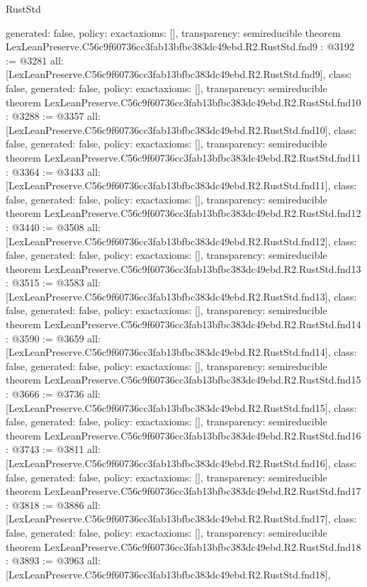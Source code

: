 \begin{lexlean}{RustStd}
\begin{coremodule}
{  generated: false,
  policy: exact{axioms: []},
  transparency: semireducible
}
theorem LexLeanPreserve.C56c9f60736cc3fab13bfbc383dc49ebd.R2.RustStd.fnd9 : @3192 := @3281 {
  all: [LexLeanPreserve.C56c9f60736cc3fab13bfbc383dc49ebd.R2.RustStd.fnd9],
  class: false,
  generated: false,
  policy: exact{axioms: []},
  transparency: semireducible
}
theorem LexLeanPreserve.C56c9f60736cc3fab13bfbc383dc49ebd.R2.RustStd.fnd10 : @3288 := @3357 {
  all: [LexLeanPreserve.C56c9f60736cc3fab13bfbc383dc49ebd.R2.RustStd.fnd10],
  class: false,
  generated: false,
  policy: exact{axioms: []},
  transparency: semireducible
}
theorem LexLeanPreserve.C56c9f60736cc3fab13bfbc383dc49ebd.R2.RustStd.fnd11 : @3364 := @3433 {
  all: [LexLeanPreserve.C56c9f60736cc3fab13bfbc383dc49ebd.R2.RustStd.fnd11],
  class: false,
  generated: false,
  policy: exact{axioms: []},
  transparency: semireducible
}
theorem LexLeanPreserve.C56c9f60736cc3fab13bfbc383dc49ebd.R2.RustStd.fnd12 : @3440 := @3508 {
  all: [LexLeanPreserve.C56c9f60736cc3fab13bfbc383dc49ebd.R2.RustStd.fnd12],
  class: false,
  generated: false,
  policy: exact{axioms: []},
  transparency: semireducible
}
theorem LexLeanPreserve.C56c9f60736cc3fab13bfbc383dc49ebd.R2.RustStd.fnd13 : @3515 := @3583 {
  all: [LexLeanPreserve.C56c9f60736cc3fab13bfbc383dc49ebd.R2.RustStd.fnd13],
  class: false,
  generated: false,
  policy: exact{axioms: []},
  transparency: semireducible
}
theorem LexLeanPreserve.C56c9f60736cc3fab13bfbc383dc49ebd.R2.RustStd.fnd14 : @3590 := @3659 {
  all: [LexLeanPreserve.C56c9f60736cc3fab13bfbc383dc49ebd.R2.RustStd.fnd14],
  class: false,
  generated: false,
  policy: exact{axioms: []},
  transparency: semireducible
}
theorem LexLeanPreserve.C56c9f60736cc3fab13bfbc383dc49ebd.R2.RustStd.fnd15 : @3666 := @3736 {
  all: [LexLeanPreserve.C56c9f60736cc3fab13bfbc383dc49ebd.R2.RustStd.fnd15],
  class: false,
  generated: false,
  policy: exact{axioms: []},
  transparency: semireducible
}
theorem LexLeanPreserve.C56c9f60736cc3fab13bfbc383dc49ebd.R2.RustStd.fnd16 : @3743 := @3811 {
  all: [LexLeanPreserve.C56c9f60736cc3fab13bfbc383dc49ebd.R2.RustStd.fnd16],
  class: false,
  generated: false,
  policy: exact{axioms: []},
  transparency: semireducible
}
theorem LexLeanPreserve.C56c9f60736cc3fab13bfbc383dc49ebd.R2.RustStd.fnd17 : @3818 := @3886 {
  all: [LexLeanPreserve.C56c9f60736cc3fab13bfbc383dc49ebd.R2.RustStd.fnd17],
  class: false,
  generated: false,
  policy: exact{axioms: []},
  transparency: semireducible
}
theorem LexLeanPreserve.C56c9f60736cc3fab13bfbc383dc49ebd.R2.RustStd.fnd18 : @3893 := @3963 {
  all: [LexLeanPreserve.C56c9f60736cc3fab13bfbc383dc49ebd.R2.RustStd.fnd18],
}
\end{coremodule}
\end{lexlean}

